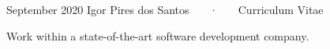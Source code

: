 \documentclass[11pt, letterpaper, draft]{academic-cv}
\begin{document}
\makecvheader

\makecvfooter
  {September 2020}
  {Igor Pires dos Santos ~~~·~~~ Curriculum Vitae}
  {\thepage}



Work within a state-of-the-art software development company.





%
%
%
%


\end{document}

